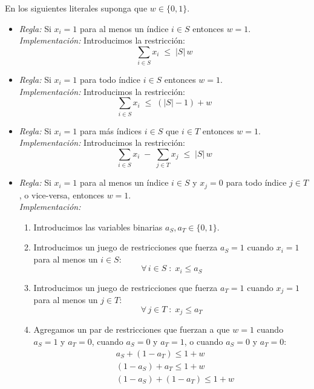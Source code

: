 \documentclass[ 10pt, xcolor = dvipsnames]{beamer}
\begin{document}
\begin{frame}[allowframebreaks]
\frametitle{\insertsection}

En los siguientes literales suponga que $w \in \{ 0, 1 \}$. 
\begin{itemize}
\item \emph{Regla:} Si $x_i = 1$ para al menos un \'indice $i \in S$ entonces $w = 1$. \\[1ex] \emph{Implementaci\'on:} Introducimos la restricci\'on: 
\[
\sum_{i \in S} x_i \; \leq \; |S| \, w
\]
\item \emph{Regla:} Si $x_i = 1$ para todo \'indice $i \in S$ entonces $w = 1$. \\[1ex] \emph{Implementaci\'on:} Introducimos la restricci\'on: 
\[
\sum_{i \in S} x_i \; \leq \; (|S|-1) + w
\]
\end{itemize}
\framebreak

\begin{itemize}
\item \emph{Regla:} Si $x_i = 1$ para m\'as \'indices $i \in S$ que $i \in T$ entonces $w = 1$. \\[1ex] \emph{Implementaci\'on:} Introducimos la restricci\'on: 
\[
\sum_{i \in S} x_i \; - \; \sum_{j \in T} x_j \; \leq \; |S| \, w
\]
\item \emph{Regla:} Si $x_i = 1$ para al menos un \'indice $i \in S$ y $x_j = 0$ para todo \'indice $j \in T$, o vice-versa, entonces $w = 1$. \\[1ex] \emph{Implementaci\'on:}
\begin{enumerate}
\item Introducimos las variables binarias $a_S, a_T \in \{ 0, 1 \}$. 
\item Introducimos un juego de restricciones que fuerza $a_S = 1$ cuando $x_i = 1$ \linebreak para al menos un $i \in S$: 
\[
\forall \, i \in S \; \colon \; x_i \leq a_S
\]
\framebreak
\item Introducimos un juego de restricciones que fuerza $a_T = 1$ cuando $x_j = 1$ \linebreak para al menos un $j \in T$: 
\[
\forall \, j \in T \; \colon \; x_j \leq a_T
\]
\item Agregamos un par de restricciones que fuerzan a que $w = 1$ cuando $a_S = 1$ y $a_T = 0$, cuando $a_S = 0$ y $a_T = 1$, o cuando $a_S = 0$ y $a_T = 0$: 
\begin{align*}
& a_S + ( 1 - a_T ) \leq 1 + w \\
& ( 1 - a_S ) + a_T \leq 1 + w \\
& ( 1 - a_S ) + ( 1 - a_T ) \leq 1 + w
\end{align*}

\end{enumerate}
\end{itemize}
\framebreak

\end{frame}
\end{document}
